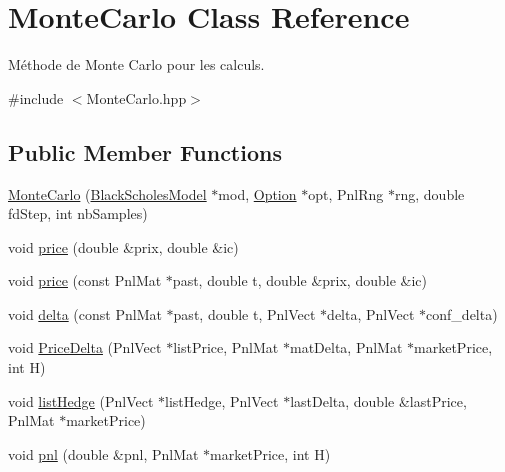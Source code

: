 \hypertarget{classMonteCarlo}{\section{Monte\-Carlo Class Reference}
\label{classMonteCarlo}
}


Méthode de Monte Carlo pour les calculs.  




{\ttfamily \#include $<$Monte\-Carlo.\-hpp$>$}

\subsection*{Public Member Functions}
\begin{DoxyCompactItemize}
\item 
\hyperlink{classMonteCarlo_a01b66bd9e983f9adc235bd80c1c544bd}{Monte\-Carlo} (\hyperlink{classBlackScholesModel}{Black\-Scholes\-Model} $\ast$mod, \hyperlink{classOption}{Option} $\ast$opt, Pnl\-Rng $\ast$rng, double fd\-Step, int nb\-Samples)
\item 
void \hyperlink{classMonteCarlo_a5979d4378e3f28878152a310d8a1f7bf}{price} (double \&prix, double \&ic)
\item 
void \hyperlink{classMonteCarlo_aa7bfce4384323c697d0b06840ad3140f}{price} (const Pnl\-Mat $\ast$past, double t, double \&prix, double \&ic)
\item 
void \hyperlink{classMonteCarlo_a6f495c9330ab7ce8f54e1b6ccb516115}{delta} (const Pnl\-Mat $\ast$past, double t, Pnl\-Vect $\ast$delta, Pnl\-Vect $\ast$conf\-\_\-delta)
\item 
void \hyperlink{classMonteCarlo_adb880ac4788d185d305d35270fa00610}{Price\-Delta} (Pnl\-Vect $\ast$list\-Price, Pnl\-Mat $\ast$mat\-Delta, Pnl\-Mat $\ast$market\-Price, int H)
\item 
void \hyperlink{classMonteCarlo_aa2eadab1f496f4c225ceaee9d3b2a37c}{list\-Hedge} (Pnl\-Vect $\ast$list\-Hedge, Pnl\-Vect $\ast$last\-Delta, double \&last\-Price, Pnl\-Mat $\ast$market\-Price)
\item 
void \hyperlink{classMonteCarlo_a1eee6066b282022752e6fb848c49b56c}{pnl} (double \&pnl, Pnl\-Mat $\ast$market\-Price, int H)
\end{DoxyCompactItemize}
